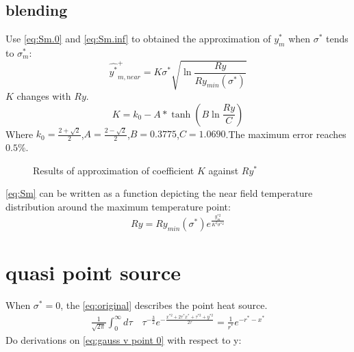 \documentclass[review, 1p, number, sort&compress,table]{elsarticle}
\begin{document}
	\subsection{blending}
	Use \autoref{eq:Sm.0} and \autoref{eq:Sm.inf} to obtained the approximation of $y^{*}_m$ when $\sigma^{*}$ tends to $\sigma^{*}_m$:
	\begin{equation} \label{eq:Sm}
		\widehat{y^{*}}_{m,near}^+=K\sigma^{*}\sqrt{\ln{\frac{Ry}{Ry_{min}(\sigma^{*})}}}
	\end{equation}
	$K$ changes with $Ry$.
	\begin{equation} \label{K@Sm}
		K=k_0-A*\tanh{\left(B\ln{\frac{Ry}{C}}\right)}
	\end{equation}
	Where $k_0=\frac{2+\sqrt{2}}{2}$,$A=\frac{2-\sqrt{2}}{2}$,$B=0.3775$,$C=1.0690$.The maximum error reaches $0.5\%$.
				\begin{figure*}[ht!]
					\begin{center}
					\end{center}
					\caption{Results of approximation of coefficient $K$ against $Ry^{*}$  }
					\label{fig:A.KvR}
				\end{figure*}
	\autoref{eq:Sm} can be written as a function depicting the near field temperature distribution around the maximum temperature point:
	\begin{equation} \label{eq:near field}
		Ry=Ry_{min}\left(\sigma^{*}\right)e^{\frac{y_m^{*2}}{K^2\sigma^{*2}}}
	\end{equation}
	\section{quasi point source}
		When $\sigma^{*}=0$, the  \autoref{eq:original} describes the point heat source.
		\begin{eqnarray}\label{eq:gauss v point 0}
		\frac{1}{\sqrt{2\pi}}\int_{0}^{\infty}{d\tau}\quad \tau^{-\frac{3}{2}}e^{-\frac{x^{*2}+2\tau^*x^{*}+\tau^{*2}+y^{*2}}{2\tau}} = \frac{1}{r^{*}}e^{-r^{*}-x^{*}}
		\end{eqnarray}
	Do derivations on \autoref{eq:gauss v point 0} with respect to y:
	
\end{document}
